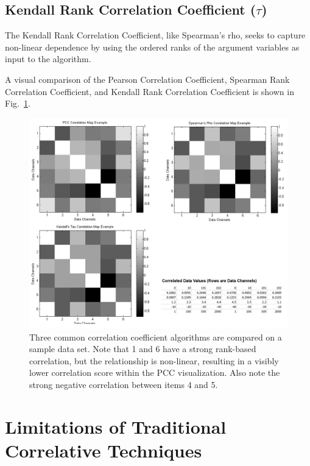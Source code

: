 \subsection{Kendall Rank Correlation Coefficient ($\tau$)}

The Kendall Rank Correlation Coefficient, like Spearman's rho, seeks to capture non-linear dependence by using the ordered ranks of the argument variables as input to the algorithm.

A visual comparison of the Pearson Correlation Coefficient, Spearman Rank Correlation Coefficient, and Kendall Rank Correlation Coefficient is shown in Fig.~\ref{fig:correlation_comparison}.

\begin{figure}[h]
\centering
    \includegraphics[width=\columnwidth]{images/correlation_comparison.png}
    \caption{Three common correlation coefficient algorithms are compared on a sample data set. Note that 1 and 6 have a strong rank-based correlation, but the relationship is non-linear, resulting in a visibly lower correlation score within the PCC visualization. Also note the strong negative correlation between items 4 and 5.}
    \label{fig:correlation_comparison}
\end{figure}





\section{Limitations of Traditional Correlative Techniques}

